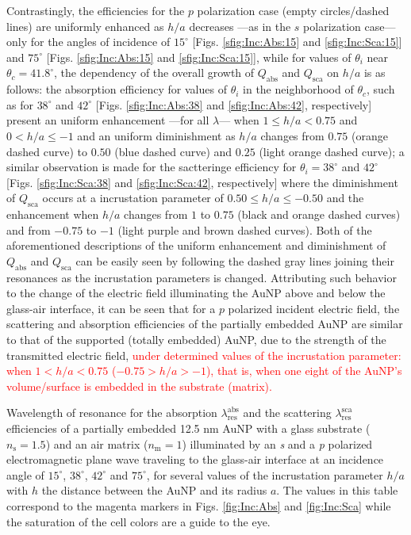 Contrastingly, the efficiencies for the $p$ polarization case (empty circles/dashed lines) are uniformly enhanced as $h/a$ decreases ---as in the $s$ polarization case--- only for the angles of incidence of $15^\circ$ [Figs. \ref{sfig:Inc:Abs:15} and \ref{sfig:Inc:Sca:15}] and $75^\circ$ [Figs. \ref{sfig:Inc:Abs:15} and \ref{sfig:Inc:Sca:15}], while for values of $\theta_i$ near $\theta_c = 41.8^\circ$, the dependency of the overall growth of $Q_\text{abs}$ and $Q_\text{sca}$ on $h/a$ is as follows: the absorption efficiency for values of $\theta_i $ in the neighborhood of $\theta_c$, such as for $38^\circ$ and $42^\circ$ [Figs. \ref{sfig:Inc:Abs:38} and \ref{sfig:Inc:Abs:42}, respectively] present an uniform enhancement ---for all $\lambda$--- when $1 \leq h/a < 0.75$ and $0< h/a \leq -1$ and an uniform diminishment as $h/a$ changes from $0.75$ (orange dashed curve) to $0.50$  (blue dashed curve)  and $0.25$  (light orange dashed curve); a similar observation is made for the sactteringe efficiency for $\theta_i = 38 ^\circ$ and $42 ^\circ$   [Figs. \ref{sfig:Inc:Sca:38} and \ref{sfig:Inc:Sca:42}, respectively] where the diminishment of $Q_\text{sca}$ occurs at a incrustation parameter of $0.50 \leq h/a \leq -0.50$ and the enhancement when $h/a$ changes from $1$ to $0.75$ (black and orange dashed curves) and from $-0.75$ to $-1$  (light purple and brown dashed curves). Both of the aforementioned descriptions of the uniform enhancement and diminishment of $Q_\text{abs}$ and $Q_\text{sca}$ can be easily seen by following the dashed gray lines joining their resonances as the incrustation parameters is changed. Attributing such behavior to the change of the electric field illuminating the AuNP above and below the glass-air interface, it can be seen that for a $p$ polarized incident electric field, the scattering and absorption efficiencies of the partially embedded AuNP are similar to that of the supported (totally embedded) AuNP, due to the strength of the transmitted electric field, \textcolor{red}{under determined values of the incrustation parameter: when $1<h/a<0.75$  ($-0.75>h/a>-1$), that is, when one eight of the AuNP's volume/surface is embedded in the substrate (matrix).}

\begin{table}[b!]\footnotesize\centering
    \caption{Wavelength of resonance for the absorption $\lambda_\text{res}^\text{abs}$ and the scattering $\lambda_\text{res}^\text{sca}$ efficiencies of a partially embedded 12.5 nm AuNP with a glass substrate ($n_\text{s} = 1.5$) and an air matrix ($n_\text{m} = 1$)    illuminated by an \textit{s} and a \textit{p} polarized electromagnetic plane wave traveling to the glass-air interface at an incidence angle of $15^\circ$,  $38^\circ$,  $42^\circ$ and  $75^\circ$, for several values of the incrustation parameter $h/a$ with $h$ the distance between the AuNP and its radius $a$. The values in this table correspond to the magenta markers in Figs. \ref{fig:Inc:Abs} and \ref{fig:Inc:Sca} while the saturation of the cell colors are a guide to the eye.}
    \label{tab:Resonances}
    
\end{table}

